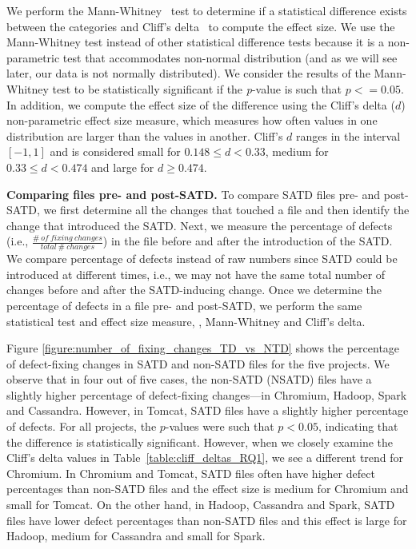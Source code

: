 We perform the Mann-Whitney~\cite{mann1947test} test to determine if a statistical difference exists between the categories and Cliff's delta~\cite{Cliff:2005} to compute the effect size. We use the Mann-Whitney test instead of other statistical difference tests because it is a non-parametric test that accommodates non-normal distribution (and as we will see later, our data is not normally distributed). We consider the results of the Mann-Whitney test to be statistically significant if the \textit{p}-value is such that $p <= 0.05$. In addition, we compute the effect size of the difference using the Cliff's delta ($d$) non-parametric effect size measure, which measures how often values in one distribution are larger than the values in another. Cliff's $d$ ranges in  the interval $[-1,1]$ and is considered small for $0.148 \le d < 0.33$, medium for $0.33 \le d < 0.474$ and large for $d \ge 0.474$.




\noindent\textbf{Comparing files pre- and post-SATD.} To compare SATD files pre- and post-SATD, we first determine all the changes that touched a file and then identify the change that introduced the SATD. Next, we measure the percentage of defects (i.e., $\frac{\#~of~fixing~changes}{total~\#~changes}$) in the file before and after the introduction of the SATD. We compare percentage of defects instead of raw numbers since SATD could be introduced at different times, i.e., we may not have the same total number of changes before and after the SATD-inducing change. Once we determine the percentage of defects in a file pre- and post-SATD, we perform the same statistical test and effect size measure, \ie{}, Mann-Whitney and Cliff's delta.


 Figure \ref{figure:number_of_fixing_changes_TD_vs_NTD} shows the percentage of defect-fixing changes in SATD and non-SATD files for the five projects. We observe that in four out of five cases, the non-SATD (NSATD) files have a slightly higher percentage of defect-fixing changes---in Chromium, Hadoop, Spark and Cassandra. However, in Tomcat, SATD files have a slightly higher percentage of defects. For all projects, the $p$-values were such that $p < 0.05$, indicating that the difference is statistically significant. However, when we closely examine the Cliff's delta values in Table~\ref{table:cliff_deltas_RQ1}, we see a different trend for Chromium. In Chromium and Tomcat, SATD files often have higher defect percentages than non-SATD files and the effect size is medium for Chromium and small for Tomcat. On the other hand, in Hadoop, Cassandra and Spark, SATD files have lower defect percentages than non-SATD files and this effect is large for Hadoop, medium for Cassandra and small for Spark.


